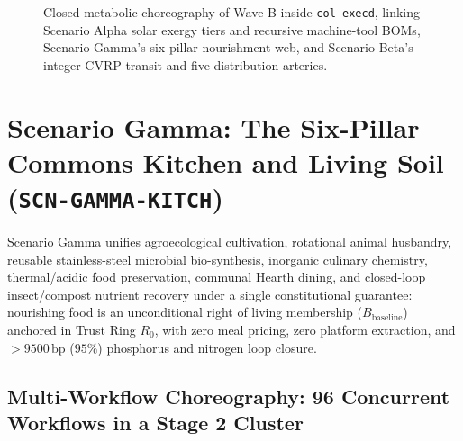 \begin{figure}[htbp]
{%
}
\caption{Closed metabolic choreography of Wave B inside \texttt{col-execd}, linking Scenario Alpha solar exergy tiers and recursive machine-tool BOMs, Scenario Gamma's six-pillar nourishment web, and Scenario Beta's integer CVRP transit and five distribution arteries.}
\label{fig:wave-b-metabolic-loop}
\end{figure}

\section{Scenario Gamma: The Six-Pillar Commons Kitchen and Living Soil (\texttt{SCN-GAMMA-KITCH})}
\label{sec:wave-b-gamma}

Scenario Gamma unifies agroecological cultivation, rotational animal husbandry, reusable
stainless-steel microbial bio-synthesis, inorganic culinary chemistry, thermal/acidic food
preservation, communal Hearth dining, and closed-loop insect/compost nutrient recovery under
a single constitutional guarantee: nourishing food is an unconditional right of living
membership ($B_{\mathrm{baseline}}$) anchored in Trust Ring $R_0$, with zero meal pricing,
zero platform extraction, and $> 9500\,\mathrm{bp}$ ($95\%$) phosphorus and nitrogen loop
closure.

\subsection{Multi-Workflow Choreography: 96 Concurrent Workflows in a Stage 2 Cluster}

